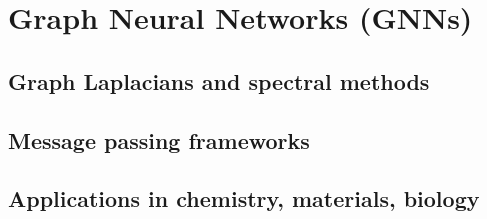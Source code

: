﻿\chapter{Graph Neural Networks (GNNs)}
\section{Graph Laplacians and spectral methods}

\section{Message passing frameworks}

\section{Applications in chemistry, materials, biology}


